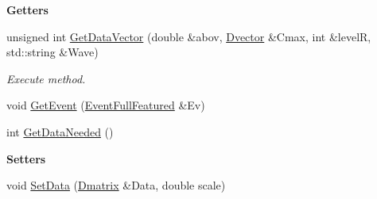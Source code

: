 \begin{Indent}\textbf{ Getters}\par
\begin{DoxyCompactItemize}
\item 
unsigned int \hyperlink{classtsa_1_1_w_d_f2_classify_ab1a24dc16c3b82462f83869c9bfef4ba}{Get\+Data\+Vector} (double \&abov, \hyperlink{namespacetsa_a8900fb03d849baf447a1a0efe2561fb2}{Dvector} \&Cmax, int \&levelR, std\+::string \&Wave)
\begin{DoxyCompactList}\small\item\em Execute method. \end{DoxyCompactList}\item 
void \hyperlink{classtsa_1_1_w_d_f2_classify_afc7171cf690b0486d3b91d715c97bed2}{Get\+Event} (\hyperlink{classtsa_1_1_event_full_featured}{Event\+Full\+Featured} \&Ev)
\item 
int \hyperlink{classtsa_1_1_w_d_f2_classify_a0f6ec6f4e5ef234dd2035f38d7cccadc}{Get\+Data\+Needed} ()
\end{DoxyCompactItemize}
\end{Indent}
\begin{Indent}\textbf{ Setters}\par
\begin{DoxyCompactItemize}
\item 
void \hyperlink{classtsa_1_1_w_d_f2_classify_a06ef587765f9590fabe3a25c5a46efb1}{Set\+Data} (\hyperlink{namespacetsa_ad260cd21c1891c4ed391fe788569aba4}{Dmatrix} \&Data, double scale)
\end{DoxyCompactItemize}
\end{Indent}
